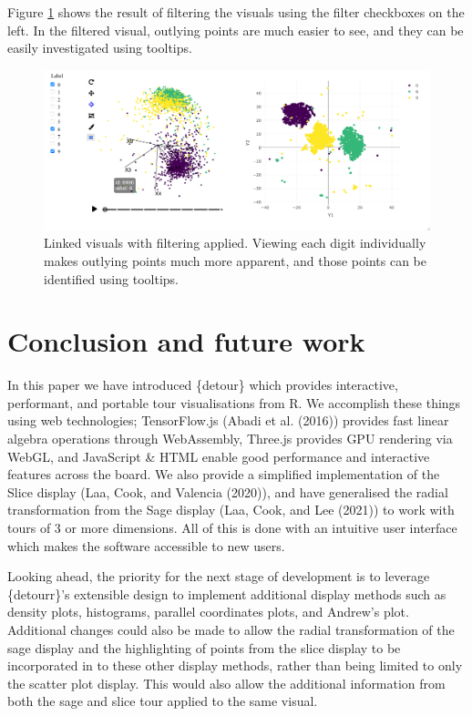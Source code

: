 Figure \ref{fig:linked-tsne-filter} shows the result of filtering the visuals using the filter checkboxes on the left. In the filtered visual, outlying points are much easier to see, and they can be easily investigated using tooltips.

\begin{figure}
\includegraphics[width=\textwidth]{figures/mnist/case-study-linked-brushing-filter} \caption{Linked visuals with filtering applied. Viewing each digit individually makes outlying points much more apparent, and those points can be identified using tooltips.}\label{fig:linked-tsne-filter}
\end{figure}

\hypertarget{conclusion-and-future-work}{%
\section{Conclusion and future work}\label{conclusion-and-future-work}}

In this paper we have introduced \{detour\} which provides interactive, performant, and portable tour visualisations from R. We accomplish these things using web technologies; TensorFlow.js (Abadi et al. (2016)) provides fast linear algebra operations through WebAssembly, Three.js provides GPU rendering via WebGL, and JavaScript \& HTML enable good performance and interactive features across the board. We also provide a simplified implementation of the Slice display (Laa, Cook, and Valencia (2020)), and have generalised the radial transformation from the Sage display (Laa, Cook, and Lee (2021)) to work with tours of 3 or more dimensions. All of this is done with an intuitive user interface which makes the software accessible to new users.

Looking ahead, the priority for the next stage of development is to leverage \{detourr\}'s extensible design to implement additional display methods such as density plots, histograms, parallel coordinates plots, and Andrew's plot. Additional changes could also be made to allow the radial transformation of the sage display and the highlighting of points from the slice display to be incorporated in to these other display methods, rather than being limited to only the scatter plot display. This would also allow the additional information from both the sage and slice tour applied to the same visual.

